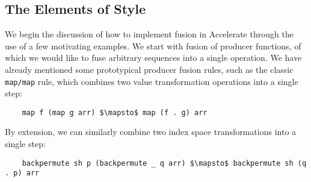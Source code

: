 \subsection{The Elements of Style}
\label{sec:elements_of_style}

We begin the discussion of how to implement fusion in Accelerate through the use
of a few motivating examples. We start with fusion of producer functions, of
which we would like to fuse arbitrary sequences into a single operation. We have
already mentioned some prototypical producer fusion rules, such as the classic
\texttt{map/map} rule, which combines two value transformation operations into a
single step:
%
\begin{lstlisting}[style=haskell,numbers=none,mathescape]
%\bf$\langle$ RULE: map/map $\rangle$%
    map f (map g arr) $\mapsto$ map (f . g) arr
\end{lstlisting}
%
By extension, we can similarly combine two index space transformations into a
single step:
%
\begin{lstlisting}[style=haskell,numbers=none,mathescape]
%\bf$\langle$ RULE: backpermute/backpermute $\rangle$%
    backpermute sh p (backpermute _ q arr) $\mapsto$ backpermute sh (q . p) arr
\end{lstlisting}

